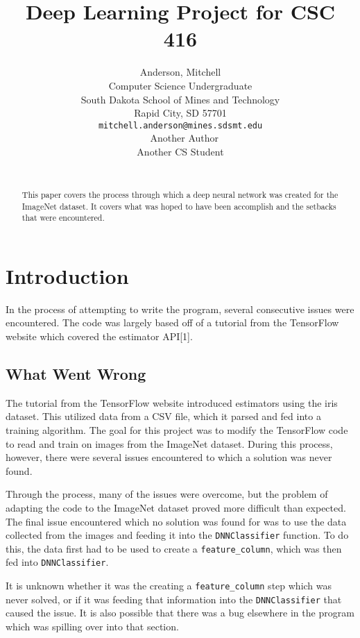 \documentclass{article}
\title{Deep Learning Project for CSC 416}
\author{
  Anderson, Mitchell \\
  Computer Science Undergraduate \\
  South Dakota School of Mines and Technology\\
  Rapid City, SD 57701 \\
  \texttt{mitchell.anderson@mines.sdsmt.edu} \\\
  \And
  Another Author \\
  Another CS Student \\\
}
\begin{document}

\maketitle

\begin{abstract}
  This paper covers the process through which a deep 
  neural network was created for the ImageNet dataset. It
  covers what was hoped to have been accomplish and the setbacks
  that were encountered.
\end{abstract}

\section{Introduction}

In the process of attempting to write the program, several consecutive
issues were encountered. The code was largely based off of a tutorial
from the TensorFlow website which covered the estimator API[1].

\subsection{What Went Wrong}

The tutorial from the TensorFlow website introduced estimators using
the iris dataset. This utilized data from a CSV file, which it parsed
and fed into a training algorithm. The goal for this project was to
modify the TensorFlow code to read and train on images from the ImageNet
dataset. During this process, however, there were several issues encountered
to which a solution was never found.

Through the process, many of the issues were overcome, but the problem
of adapting the code to the ImageNet dataset proved more difficult than
expected. The final issue encountered which no solution was found for
was to use the data collected from the images and feeding it into the
\texttt{DNNClassifier} function. To do this, the data first had to be used to
create a \texttt{feature\_column}, which was then fed into \texttt{DNNClassifier}.

It is unknown whether it was the creating a \texttt{feature\_column} step which
was never solved, or if it was feeding that information into the
\texttt{DNNClassifier} that caused the issue. It is also possible that there
was a bug elsewhere in the program which was spilling over into that
section.
\end{document}
